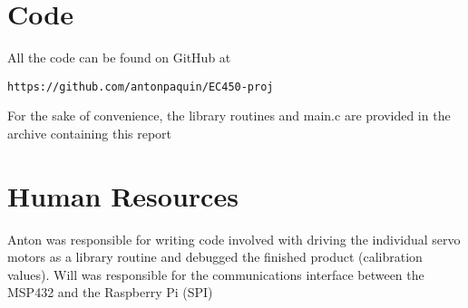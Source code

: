 \documentclass[10pt]{article}
\begin{document}
\section{Code}


All the code can be found on GitHub at 
\begin{lstlisting}
https://github.com/antonpaquin/EC450-proj
\end{lstlisting}
For the sake of convenience, the library routines and main.c are provided in the archive containing this report

\section{Human Resources}
Anton was responsible for writing code involved with driving the individual servo motors as a library routine and debugged the finished product (calibration values).
Will was responsible for the communications interface between the MSP432 and the Raspberry Pi (SPI)




\end{document}
